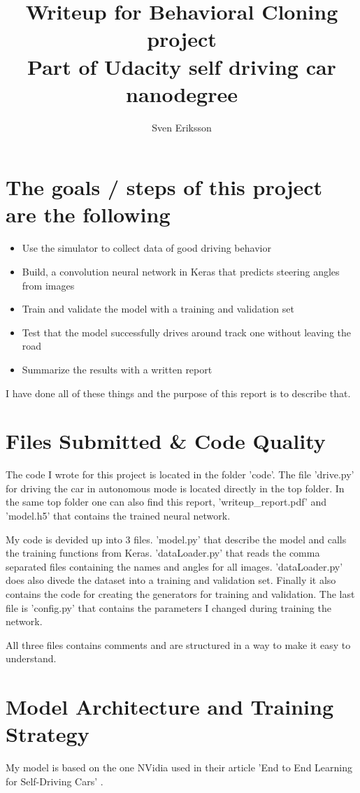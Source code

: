 \documentclass[12pt,a4paper]{article}
\author{Sven Eriksson}
\title{Writeup for Behavioral Cloning project \\ \large{Part of Udacity self driving car nanodegree}}
\begin{document}
\maketitle

\section*{The goals / steps of this project are the following}
\begin{itemize}
\item Use the simulator to collect data of good driving behavior
\item Build, a convolution neural network in Keras that predicts steering angles from images
\item Train and validate the model with a training and validation set
\item Test that the model successfully drives around track one without leaving the road
\item Summarize the results with a written report
\end{itemize}

I have done all of these things and the purpose of this report is to describe that.

\section{Files Submitted \& Code Quality}

The code I wrote for this project is located in the folder 'code'. The file 'drive.py' for driving the car in autonomous mode is located directly in the top folder. In the same top folder one can also find this report, 'writeup\_report.pdf' and 'model.h5' that contains the trained neural network.

My code is devided up into 3 files. 'model.py' that describe the model and calls the training functions from Keras. 'dataLoader.py' that reads the comma separated files containing the names and angles for all images. 'dataLoader.py' does also divede the dataset into a training and validation set. Finally it also contains the code for creating the generators for training and validation. The last file is 'config.py' that contains the parameters I changed during training the network.

All three files contains comments and are structured in a way to make it easy to understand.

\section{Model Architecture and Training Strategy}
My model is based on the one NVidia used in their article 'End to End Learning for Self-Driving Cars' \cite{DBLP:journals/corr/BojarskiTDFFGJM16}.
\end{document}

